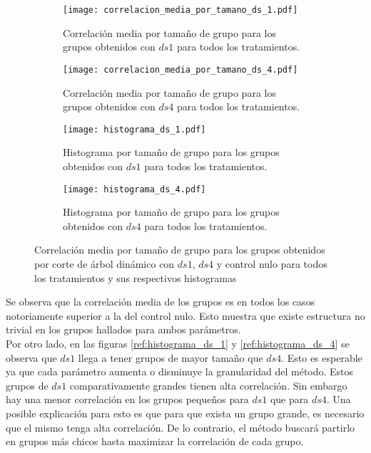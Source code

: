 \begin{figure*}[t!]
    \centering
    \begin{subfigure}[t]{0.45\textwidth}
    \centering
    \texttt{[image: correlacion\_media\_por\_tamano\_ds\_1.pdf]}
    \caption{Correlación media por tamaño de grupo para los grupos obtenidos con $ds1$ para todos los tratamientos.}
    \label{fig:correlacion_media_por_tamano_ds_1}
    \end{subfigure}
    \begin{subfigure}[t]{0.45\textwidth}
    \centering
    \texttt{[image: correlacion\_media\_por\_tamano\_ds\_4.pdf]}
    \caption{Correlación media por tamaño de grupo para los grupos obtenidos con $ds4$ para todos los tratamientos.}
    \label{fig:correlacion_media_por_tamano_ds_4}
    \end{subfigure}
    \centering
    \begin{subfigure}[t]{0.45\textwidth}
    \centering
    \texttt{[image: histograma\_ds\_1.pdf]}
    \caption{Histograma por tamaño de grupo para los grupos obtenidos con $ds1$ para todos los tratamientos.}
    \label{fig:histograma_ds_1}
    \end{subfigure}
    \begin{subfigure}[t]{0.45\textwidth}
    \centering
    \texttt{[image: histograma\_ds\_4.pdf]}
    \caption{Histograma por tamaño de grupo para los grupos obtenidos con $ds4$ para todos los tratamientos.}
    \label{fig:histograma_ds_4}
    \end{subfigure}    
    \caption{Correlación media por tamaño de grupo para los grupos obtenidos por corte de árbol dinámico con $ds1$, $ds4$ y control nulo para todos los tratamientos y sus respectivos histogramas}
\end{figure*}
Se observa que la correlación media de los grupos es en todos los casos notoriamente superior a la del control nulo. Esto muestra que existe estructura no trivial en los grupos hallados para ambos parámetros. \\
Por otro lado, en las figuras \ref{ref:histograma_ds_1} y \ref{ref:histograma_ds_4} se observa que $ds1$ llega a tener grupos de mayor tamaño que $ds4$. Esto es esperable ya que cada parámetro aumenta o disminuye la granularidad del método. Estos grupos de $ds1$ comparativamente grandes tienen alta correlación. Sin embargo hay una menor correlación en los grupos pequeños para $ds1$ que para $ds4$. Una posible explicación para esto es que para que exista un grupo grande, es necesario que el mismo tenga alta correlación. De lo contrario, el método buscará partirlo en grupos más chicos hasta maximizar la correlación de cada grupo.\\

